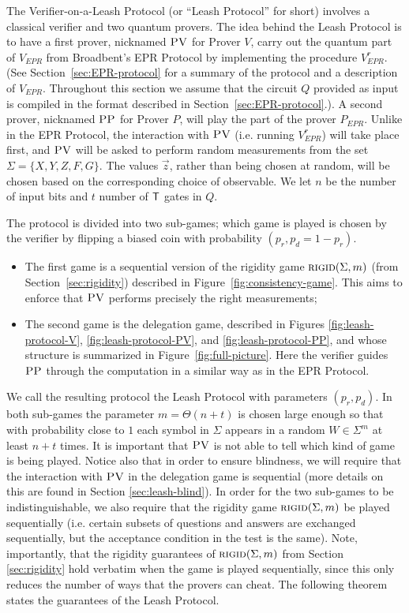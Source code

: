 \documentclass[11pt,letter]{article}
\theoremstyle{remark}
\theoremstyle{definition}
\newcommand{\rigid}{\textsc{rigid}}
\newcommand{\pv}{\textsc{PV}}
\newcommand{\pp}{\textsc{PP}}
\begin{document}
The Verifier-on-a-Leash Protocol (or ``Leash Protocol'' for short) involves a classical verifier and two quantum provers.
The idea behind the Leash Protocol is to have a first prover, nicknamed $\pv$ for Prover $V$, carry out the quantum part of $V_{EPR}$ from Broadbent's EPR Protocol by implementing the procedure $V_{EPR}^r$. (See Section~\ref{sec:EPR-protocol} for a summary of the protocol and a description of $V_{EPR}$. Throughout this section we assume that the circuit $Q$ provided as input is compiled in the format described in Section~\ref{sec:EPR-protocol}.). A second prover, nicknamed $\pp$ for Prover $P$, will play the part of the prover $P_{EPR}$. Unlike in the EPR Protocol, the interaction with $\pv$ (i.e. running $V_{EPR}^r$) will take place {first}, and $\pv$ will be asked to perform {random} measurements from the set $\Sigma = \{X,Y,Z,F,G\}$. The values $\vec{z}$, rather than being chosen at random, will be chosen based on the corresponding choice of observable. We let $n$ be the number of input bits and $t$ number of $\sf T$ gates in $Q$. 

The protocol is divided into two sub-games; which game is played is chosen by the verifier by flipping a biased coin with probability $(p_r,p_d=1-p_r)$.
\begin{itemize}[nolistsep]
\item The first game is a sequential version of the rigidity game $\rigid(\Sigma,m)$ (from Section~\ref{sec:rigidity}) described in Figure~\ref{fig:consistency-game}. This aims to enforce that $\pv$ performs precisely the right measurements;

\item The second game is the delegation game, described in Figures \ref{fig:leash-protocol-V}, \ref{fig:leash-protocol-PV}, and \ref{fig:leash-protocol-PP}, and whose structure is summarized in Figure~\ref{fig:full-picture}. Here the verifier guides $\pp$ through the computation in a similar way as in the EPR Protocol.
\end{itemize}

We call the resulting protocol the Leash Protocol with parameters $(p_r,p_d)$. In both sub-games the parameter $m=\Theta(n+t)$ is chosen large enough so that with probability close to $1$ each symbol in $\Sigma$ appears in a random $W\in \Sigma^m$ at least $n+t$ times. It is important that $\pv$ is not able to tell which kind of game is being played. Notice also that in order to ensure blindness, we will require that the interaction with $\pv$ in the delegation game is sequential (more details on this are found in Section \ref{sec:leash-blind}). In order for the two sub-games to be indistinguishable, we also require that the rigidity game $\rigid(\Sigma,m)$ be played sequentially (i.e. certain subsets of questions and answers are exchanged sequentially, but the acceptance condition in the test is the same). Note, importantly, that the rigidity guarantees of $\rigid(\Sigma,m)$ from Section \ref{sec:rigidity} hold verbatim when the game is played sequentially, since this only reduces the number of ways that the provers can cheat. The following theorem states the guarantees of the Leash Protocol.
\end{document}
